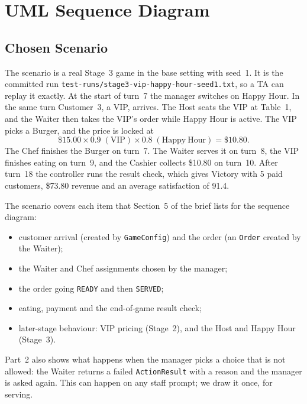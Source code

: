 \newsavebox{\seqfitbox}
\newlength{\seqfitw}\newlength{\seqfith}
\newcommand{\seqfit}[1]{%
  \sbox{\seqfitbox}{#1}%
  \setlength{\seqfitw}{\wd\seqfitbox}%
  \setlength{\seqfith}{\dimexpr\ht\seqfitbox+\dp\seqfitbox\relax}%
  \ifdim\dimexpr\textwidth*\seqfith/\seqfitw\relax>0.82\textheight
    \resizebox{!}{0.82\textheight}{\usebox{\seqfitbox}}%
  \else
    \resizebox{\textwidth}{!}{\usebox{\seqfitbox}}%
  \fi}
\section{UML Sequence Diagram}
\label{sec:sequence}

\subsection{Chosen Scenario}

The scenario is a real Stage~3 game in the base setting with seed~1. It is the committed run \texttt{test-runs/stage3-vip-happy-hour-seed1.txt}, so a TA can replay it exactly. At the start of turn~7 the manager switches on Happy Hour. In the same turn Customer~3, a VIP, arrives. The Host seats the VIP at Table~1, and the Waiter then takes the VIP's order while Happy Hour is active. The VIP picks a Burger, and the price is locked at
\[
\$15.00 \times 0.9 \;(\mathrm{VIP}) \times 0.8 \;(\mathrm{Happy\ Hour}) = \$10.80 .
\]
The Chef finishes the Burger on turn~7. The Waiter serves it on turn~8, the VIP finishes eating on turn~9, and the Cashier collects \$10.80 on turn~10. After turn~18 the controller runs the result check, which gives Victory with 5 paid customers, \$73.80 revenue and an average satisfaction of 91.4.

The scenario covers each item that Section~5 of the brief lists for the sequence diagram:
\begin{itemize}[nosep]
  \item customer arrival (created by \texttt{GameConfig}) and the order (an \texttt{Order} created by the Waiter);
  \item the Waiter and Chef assignments chosen by the manager;
  \item the order going \texttt{READY} and then \texttt{SERVED};
  \item eating, payment and the end-of-game result check;
  \item later-stage behaviour: VIP pricing (Stage~2), and the Host and Happy Hour (Stage~3).
\end{itemize}
Part~2 also shows what happens when the manager picks a choice that is not allowed: the Waiter returns a failed \texttt{ActionResult} with a reason and the manager is asked again. This can happen on any staff prompt; we draw it once, for serving.

